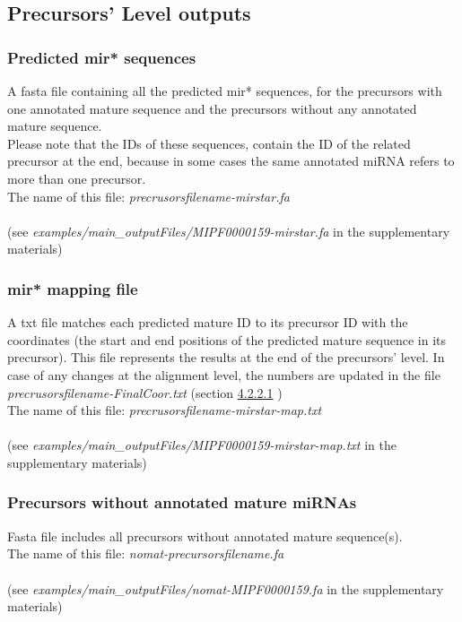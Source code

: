 \documentclass[a4paper,20pt]{report}
\begin{document}
\subsection{Precursors' Level outputs}
\subsubsection{Predicted mir* sequences}
\label{sec:mirspred}
\noindent
A fasta file containing all the predicted mir* sequences, for the precursors with one annotated mature sequence and the 
precursors without any annotated mature sequence.\\
Please note that the IDs of these sequences, contain the ID of the related precursor at the end, because in some cases
the same annotated miRNA refers to more than one precursor.\\
The name of this file: \textit{precrusorsfilename-mirstar.fa}\\\\
(see \textit{examples/main\_outputFiles/MIPF0000159-mirstar.fa} in the supplementary materials)
\subsubsection{mir* mapping file}
A txt file matches each predicted mature ID to its precursor ID with the coordinates (the start 
and end positions of the predicted mature sequence in its precursor). This file represents the 
results at the end of the precursors' level. In case of any changes at the alignment level, the 
numbers are updated in the file \textit{precrusorsfilename-FinalCoor.txt} (section \hyperref[sec:finalcoor]{4.2.2.1} )\\ 
The name of this file: \textit{precrusorsfilename-mirstar-map.txt}\\\\
(see \textit{examples/main\_outputFiles/MIPF0000159-mirstar-map.txt} in the supplementary materials)
\subsubsection{Precursors without annotated mature miRNAs}
\noindent
Fasta file includes all precursors without annotated mature sequence(s).\\
The name of this file: \textit{nomat-precursorsfilename.fa}\\\\
(see \textit{examples/main\_outputFiles/nomat-MIPF0000159.fa} in the supplementary materials)
\end{document}
